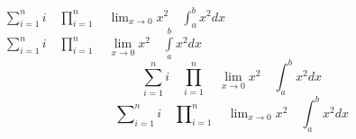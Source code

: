 $ \sum_{i=1}^n i\quad \prod_{i=1}^n\quad 
    \lim_{x\to0}x^2\quad \int_a^b x^2 dx $\\
$ \sum\limits_{i=1}^n i\quad \prod\limits_{i=1}^n\quad 
    \lim\limits_{x\to0}x^2\quad \int\limits_a^b x^2 dx $
\[ \sum_{i=1}^n i\quad \prod_{i=1}^n\quad 
    \lim_{x\to0}x^2\quad \int_a^b x^2 dx \]
\[ \sum\nolimits_{i=1}^n i\quad 
    \prod\nolimits_{i=1}^n\quad 
    \lim\nolimits_{x\to0}x^2\quad 
    \int\nolimits_a^b x^2 dx \]
